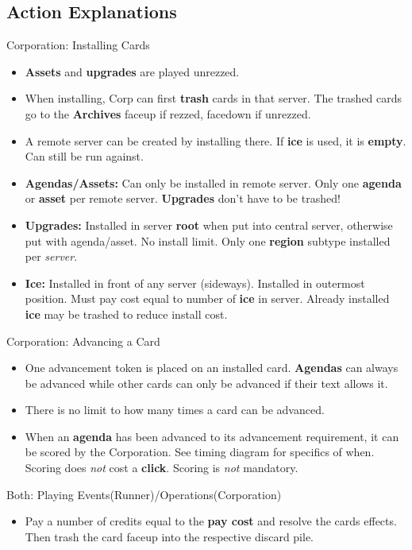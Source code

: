 \documentclass[12pt]{article}
\newenvironment{itemizeCustom}
{\begin{itemize}
  \setlength{\itemsep}{1pt}
  \setlength{\parskip}{0pt}
  \setlength{\parsep}{0pt}}
{\end{itemize}}
\begin{document}
\begin{multicols*}{2}
\section*{Action Explanations}
Corporation: Installing Cards
\begin{itemizeCustom}
	\item \textbf{Assets} and \textbf{upgrades} are played unrezzed. 
	\item When installing, Corp can first \textbf{trash} cards in that server. The trashed cards go to the \textbf{Archives} faceup if rezzed, facedown if unrezzed.
	\item A remote server can be created by installing there. If \textbf{ice} is used, it is \textbf{empty}. Can still be run against.
	\item \textbf{Agendas/Assets:} Can only be installed in remote server. Only one \textbf{agenda} or \textbf{asset} per remote server. \textbf{Upgrades} don't have to be trashed!
	\item \textbf{Upgrades:} Installed in server \textbf{root} when put into central server, otherwise put with agenda/asset. No install limit. Only one \textbf{region} subtype installed per \emph{server}.
	\item \textbf{Ice:} Installed in front of any server (sideways). Installed in outermost position. Must pay cost equal to number of \textbf{ice} in server. Already installed \textbf{ice} may be trashed to reduce install cost.
\end{itemizeCustom}

Corporation: Advancing a Card
\begin{itemizeCustom}
	\item One advancement token is placed on an installed card. \textbf{Agendas} can always be advanced while other cards can only be advanced if their text allows it. 
	\item There is no limit to how many times a card can be advanced. 
	\item When an \textbf{agenda} has been advanced to its advancement requirement, it can be scored by the Corporation. See timing diagram for specifics of when. Scoring does \emph{not} cost a \textbf{click}. Scoring is \emph{not} mandatory.
\end{itemizeCustom}

Both: Playing Events(Runner)/Operations(Corporation)
\begin{itemizeCustom}
	\item Pay a number of credits equal to the \textbf{pay cost} and resolve the cards effects. Then trash the card faceup into the respective discard pile.
\end{itemizeCustom}


\end{multicols*}
\end{document}
